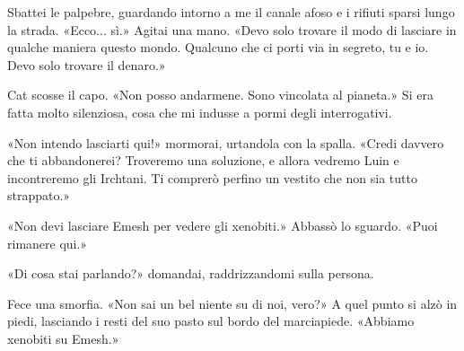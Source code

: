 Sbattei le palpebre, guardando intorno a me il canale afoso e i rifiuti
sparsi lungo la strada. «Ecco... sì.» Agitai una mano. «Devo solo
trovare il modo di lasciare in qualche maniera questo mondo. Qualcuno
che ci porti via in segreto, tu e io. Devo solo trovare il denaro.»

Cat scosse il capo. «Non posso andarmene. Sono vincolata al pianeta.» Si
era fatta molto silenziosa, cosa che mi indusse a pormi degli
interrogativi.

«Non intendo lasciarti qui!» mormorai, urtandola con la spalla. «Credi
davvero che ti abbandonerei? Troveremo una soluzione, e allora vedremo
Luin e incontreremo gli Irchtani. Ti comprerò perfino un vestito che non
sia tutto strappato.»

«Non devi lasciare Emesh per vedere gli xenobiti.» Abbassò lo sguardo.
«Puoi rimanere qui.»

«Di cosa stai parlando?» domandai, raddrizzandomi sulla persona.

Fece una smorfia. «Non sai un bel niente su di noi, vero?» A quel punto
si alzò in piedi, lasciando i resti del suo pasto sul bordo del
marciapiede. «Abbiamo xenobiti su Emesh.»

